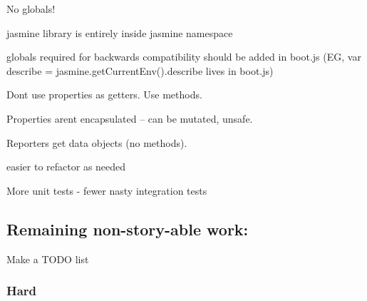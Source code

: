 
\begin{DoxyEnumerate}
\item No globals!
\begin{DoxyItemize}
\item jasmine library is entirely inside {\ttfamily jasmine} namespace
\item globals required for backwards compatibility should be added in {\ttfamily boot.\+js} (E\+G, var describe = jasmine.\+get\+Current\+Env().describe lives in boot.\+js)
\end{DoxyItemize}
\end{DoxyEnumerate}
\begin{DoxyEnumerate}
\item Don\textquotesingle{}t use properties as getters. Use methods.
\begin{DoxyItemize}
\item Properties aren\textquotesingle{}t encapsulated -- can be mutated, unsafe.
\end{DoxyItemize}
\end{DoxyEnumerate}
\begin{DoxyEnumerate}
\item Reporters get data objects (no methods).
\begin{DoxyItemize}
\item easier to refactor as needed
\end{DoxyItemize}
\end{DoxyEnumerate}
\begin{DoxyEnumerate}
\item More unit tests -\/ fewer nasty integration tests
\end{DoxyEnumerate}

\subsection*{Remaining non-\/story-\/able work\+:}


\begin{DoxyItemize}
\item Make a {\ttfamily T\+O\+D\+O} list
\end{DoxyItemize}

\subsubsection*{Hard}


